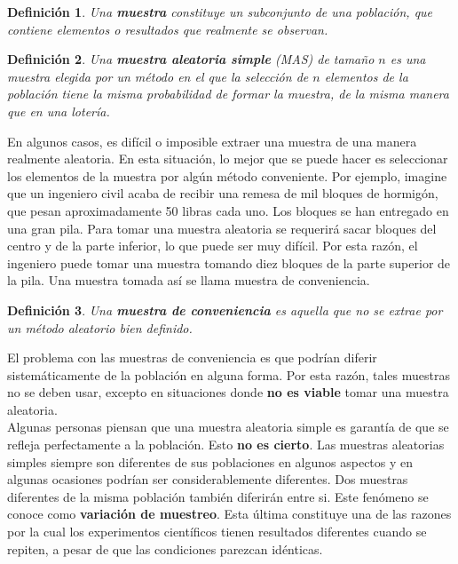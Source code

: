 \documentclass[10pt,a4paper]{book}
\newtheorem{defi}{\textbf{Definición}}
\begin{document}
\begin{defi}
	Una \textbf{muestra} constituye un subconjunto de una población, que contiene elementos o resultados que realmente se observan.
\end{defi}

\begin{defi}
	Una \textbf{muestra aleatoria simple} (\textit{MAS}) de tamaño $ n $ es una muestra elegida por un método en el que la selección de $ n $ elementos de la población tiene la misma probabilidad de formar la muestra, de la misma manera que en una lotería.
\end{defi}

En algunos casos, es difícil o imposible extraer una muestra de una manera realmente aleatoria. En esta situación, lo mejor que se puede hacer es seleccionar los elementos de la muestra por algún método conveniente. Por ejemplo, imagine que un ingeniero civil acaba de recibir una remesa de mil bloques de hormigón, que pesan aproximadamente 50 libras cada uno. Los bloques se han entregado en una gran pila. Para tomar una muestra aleatoria se requerirá sacar bloques del centro y de la parte inferior, lo que puede ser muy difícil. Por esta razón, el ingeniero puede tomar una muestra tomando diez bloques de la parte superior de la pila. Una muestra tomada así se llama muestra de conveniencia.\\

\begin{defi}
	Una \textbf{muestra de conveniencia} es aquella que no se extrae por un método aleatorio bien definido.
\end{defi}

El problema con las muestras de conveniencia es que podrían diferir sistemáticamente de la población en alguna forma. Por esta razón, tales muestras no se deben usar, excepto en situaciones donde \textbf{no es viable} tomar una muestra aleatoria.\\

Algunas personas piensan que una muestra aleatoria simple es garantía de que se refleja perfectamente a la población. Esto \textbf{no es cierto}. Las muestras aleatorias simples siempre son diferentes de sus poblaciones en algunos aspectos y en algunas ocasiones podrían ser considerablemente diferentes. Dos muestras diferentes de la misma población también diferirán entre si. Este fenómeno se conoce como \textbf{variación de muestreo}. Esta última constituye una de las razones por la cual los experimentos científicos tienen resultados diferentes cuando se repiten, a pesar de que las condiciones parezcan idénticas.\\
\end{document}
